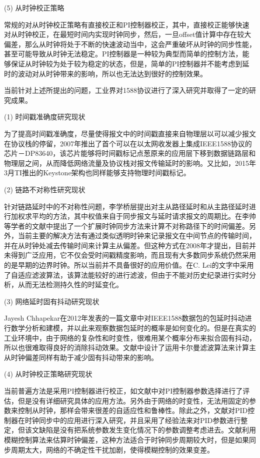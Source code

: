 (5) 从时钟校正策略

常规的对从时钟校正策略有直接校正和PI控制器校正，其中，直接校正能够快速对从时钟校正，在最短时间内实现时钟同步，然后，一旦offset值计算中存在较大偏差，那么从时钟将处于不断的快速波动当中，这会严重破坏从时钟的同步性能，甚至可能导致从时钟无法稳定。PI控制器是一种较为典型而简单的控制方法，能够保证从时钟较为处于较为稳定的状态，但是，简单的PI控制器并不能考虑到延时的波动对从时钟带来的影响，所以也无法达到很好的控制效果。

当前针对上述所提出的问题，工业界对1588协议进行了深入研究并取得了一定的研究成果。

(1) 时间戳准确度研究现状

为了提高时间戳准确度，尽量使得报文中的时间戳直接来自物理层以可以减少报文在协议栈的停留，2007年推出了首个可以在以太网收发器上集成IEEE1588协议的芯片－DP83640\supercite{4}，该芯片能够将时间戳标记点葱原来的应用层下移到数据链路层和物理层之间，从而降低网络流量及协议栈对报文传输延时的影响。又比如，2015年3月TI推出的Keystone架构也同样能够支持物理时间戳标记\supercite{5}。

(2) 链路不对称性研究现状

针对链路延时中的不对称性问题，李学桥层提出对主从路径延时和从主路径延时进行加权求平均的方法，其中权值来自于同步报文与延时请求报文的周期比\supercite{6}。在李帅等学者的文献\parencite{7}中提出了一个扩展时钟同步方法来计算不对称路径下的时间偏差。另外，当前主要的解决方法有通过类似透明时钟来记录报文在中间节点的传输时间，并在从时钟处减去传输时间来计算主从偏差。但这种方式在2008年才提出，目前并未得到广泛应用，它不仅会受时间戳精度影响，而且现有大多数同步系统仍然采用的是早期的边界时钟。所以当前并不具备很好的应用价值。在C. Lei的文字\supercite{57}中采用了自适应滤波算法，该算法能较好的进行滤波，但由于不能对历史纪录进行实时分析，从而无法检测持久性的时延变化。

(3) 网络延时固有抖动研究现状

Jayesh Chhapekar在2012年发表的一篇文章中对IEEE1588数据包的包延时抖动进行数学分析和建模，并以此来观察数据包延时的概率是如何变化的\supercite{8}。但是在真实的工业环境中，由于网络的复杂性和时变性，很难用某个概率分布来拟合固有抖动，所以也很难取得良好的消除抖动效果。文献\parencite{9}中设计了运用卡尔曼滤波算法来计算主从时钟偏差同样有助于减少固有抖动带来的影响。

(4) 从时钟校正策略研究现状

当前普遍方法是采用PI控制器进行校正，如文献\parencite{10}中对PI控制器参数选择进行了评估，但是没有详细研究具体的应用方法。另外由于网络的时变性，无法用固定的参数来控制从时钟，那样会带来很差的自适应性和鲁棒性。除此之外，文献\parencite{11}对PID控制器在时钟同步中的应用进行深入研究，并且采用了经验法来对PID参数进行整定，但该文缺陷是没有把系统参数发生变化情况下的参数调整考虑进去。文献\parencite{12}利用模糊控制算法来估算时钟偏差，这种方法适合于时钟同步周期较大时，但是如果同步周期太大，网络的不确定性干扰加剧，使得模糊控制的效果变差。

